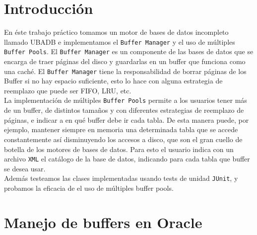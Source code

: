 \documentclass[a4paper,10pt]{article}
\begin{document}
		\maketitle

\newpage
\thispagestyle{empty}
\mbox{}

	
 \tableofcontents
\newpage

\section{Introducci\'on}
En éste trabajo práctico tomamos un motor de bases de datos incompleto llamado UBADB e implementamos el \texttt{Buffer Manager} y el uso de múltiples \texttt{Buffer Pools}. El \texttt{Buffer Manager} es un componente de las bases de datos que se encarga de traer páginas del disco y guardarlas en un buffer que funciona como una caché. El \texttt{Buffer Manager} tiene la responsabilidad de borrar páginas de los Buffer si no hay espacio suficiente, esto lo hace con alguna estrategia de reemplazo que puede ser FIFO, LRU, etc.\\

La implementación de múltiples \texttt{Buffer Pools} permite a los usuarios tener más de un buffer, de distintos tamaños y con diferentes estrategias de reemplazo de páginas, e indicar a en qué buffer debe ir cada tabla. De esta manera puede, por ejemplo, mantener siempre en memoria una determinada tabla que se accede constantemente así disminuyendo los accesos a disco, que son el gran cuello de botella de los motores de bases de datos. Para esto el usuario indica con un archivo \texttt{XML} el catálogo de la base de datos, indicando para cada tabla que buffer se desea usar.\\

Además testeamos las clases implementadas usando tests de unidad \texttt{JUnit}, y probamos la eficacia de el uso de múltiples buffer pools.



 \newpage

\section{Manejo de buffers en Oracle}
\end{document}
